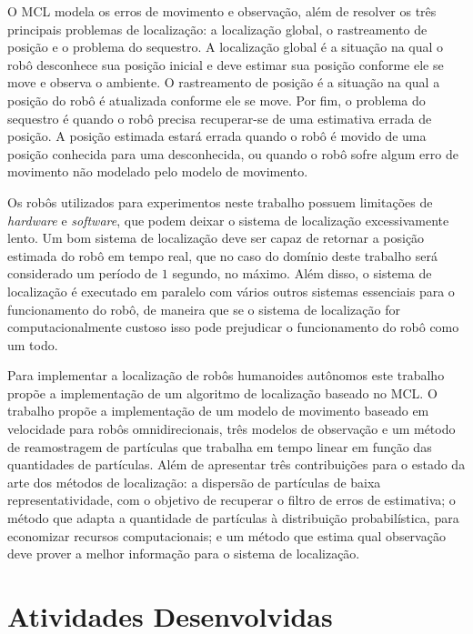 \documentclass[
  12pt,       %
  oneside,
  a4paper,      %
  english,      %
  french,       %
  spanish,      %
  brazil,       %
  ]{abntex2}
\begin{document}
O MCL modela os erros de movimento e observação, além de resolver os três principais problemas de localização: a localização global, o rastreamento de posição e o problema do sequestro.
A localização global é a situação na qual o robô desconhece sua posição inicial e deve estimar sua posição conforme ele se move e observa o ambiente.
O rastreamento de posição é a situação na qual a posição do robô é atualizada conforme ele se move.
Por fim, o problema do sequestro é quando o robô precisa recuperar-se de uma estimativa errada de posição.
A posição estimada estará errada quando o robô é movido de uma posição conhecida para uma desconhecida, ou quando o robô sofre algum erro de movimento não modelado pelo modelo de movimento.

Os robôs utilizados para experimentos neste trabalho possuem limitações de \textit{hardware} e \textit{software}, que podem deixar o sistema de localização excessivamente lento.
Um bom sistema de localização deve ser capaz de retornar a posição estimada do robô em tempo real, que no caso do domínio deste trabalho será considerado um período de $1$ segundo, no máximo.
Além disso, o sistema de localização é executado em paralelo com vários outros sistemas essenciais para o funcionamento do robô, de maneira que se o sistema de localização for computacionalmente custoso isso pode prejudicar o funcionamento do robô como um todo.

Para implementar a localização de robôs humanoides autônomos este trabalho propõe a implementação de um algoritmo de localização baseado no MCL.
O trabalho propõe a implementação de um modelo de movimento baseado em velocidade para robôs omnidirecionais, três modelos de observação e um método de reamostragem de partículas que trabalha em tempo linear em função das quantidades de partículas.
Além de apresentar três contribuições para o estado da arte dos métodos de localização:
a dispersão de partículas de baixa representatividade, com o objetivo de recuperar o filtro de erros de estimativa;
o método que adapta a quantidade de partículas à distribuição probabilística, para economizar recursos computacionais;
e um método que estima qual observação deve prover a melhor informação para o sistema de localização.


\chapter{Atividades Desenvolvidas}
\end{document}
